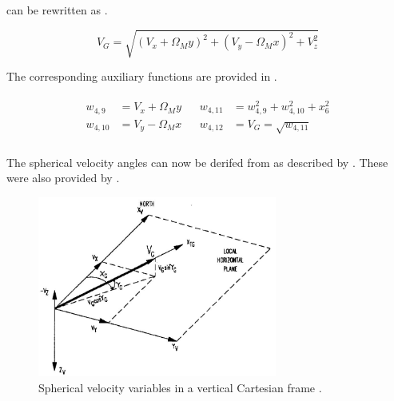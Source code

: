  can be rewritten as .

\begin{equation}\label{eq:xfifteen}
V_{G} = \sqrt{\left(V_{x}+\Omega_{M}y\right)^{2}+\left(V_{y}-\Omega_{M}x\right)^{2}+V_{z}^{2}} 
\end{equation}

The corresponding auxiliary functions are provided in .

\begin{align} \label{eq:velocityAuxF}
\begin{split}
w_{4,9} &= V_{x}+\Omega_{M}y \\
w_{4,10} &= V_{y}-\Omega_{M}x \\
\end{split}
&
\begin{split}
w_{4,11} &= w_{4,9}^{2}+w_{4,10}^{2}+x_{6}^{2} \\
w_{4,12} &= V_{G}=\sqrt{w_{4,11}} \\
\end{split} 
\end{align} 

 
The spherical velocity angles can now be derifed from  as described by . These were also provided by \cite{mooij1994motion}. 

 \begin{figure}[!ht]
\centering
\includegraphics[width=0.7\textwidth]{figures/reference_frames/vertical_spherical_mooij1994motion.jpg}
\caption{Spherical velocity variables in a vertical Cartesian frame \citep{mooij1994motion}.}
\label{fig:vertical_spherical_mooij1994motion}
\end{figure}



